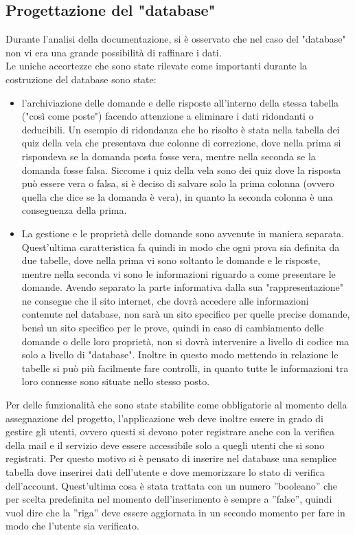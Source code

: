 \subsection{Progettazione del "database"}
Durante l'analisi della documentazione, si è osservato che nel caso del "database" non vi era una grande possibilità di raffinare i dati.\\
Le uniche accortezze che sono state rilevate come importanti durante la costruzione del database sono state:
\begin{itemize}
	\item l'archiviazione delle domande e delle risposte all'interno della stessa tabella ("così come poste") facendo attenzione a eliminare i dati ridondanti o deducibili. Un esempio di ridondanza che ho risolto è stata nella tabella dei quiz della vela che presentava due colonne di correzione, dove nella prima si rispondeva se la domanda posta fosse vera, mentre nella seconda se la domanda fosse falsa. Siccome i quiz della vela sono dei quiz dove la risposta può essere vera o falsa, si è deciso di salvare solo la prima colonna (ovvero quella che dice se la domanda è vera), in quanto la seconda colonna è una conseguenza della prima. 
	
	\item La gestione e le proprietà delle domande sono avvenute in maniera separata. Quest'ultima caratteristica fa quindi in modo che ogni prova sia definita da due tabelle, dove nella prima vi sono soltanto le domande e le risposte, mentre nella seconda vi sono le informazioni riguardo a come presentare le domande. Avendo separato la parte informativa dalla sua "rappresentazione" ne consegue che il sito internet, che dovrà accedere alle informazioni contenute nel database, non sarà un sito specifico per quelle precise domande, bensì un sito specifico per le prove, quindi in caso di cambiamento delle domande o delle loro proprietà, non si dovrà intervenire a livello di codice ma solo a livello di "database". Inoltre in questo modo mettendo in relazione le tabelle si può più facilmente fare controlli, in quanto tutte le informazioni tra loro connesse sono situate nello stesso posto.
\end{itemize}

Per delle funzionalità che sono state stabilite come obbligatorie al momento della assegnazione del progetto, l'applicazione web deve inoltre essere in grado di gestire gli utenti, ovvero questi si devono poter registrare anche con la verifica della mail e il servizio deve essere accessibile solo a quegli utenti che si sono registrati. Per questo motivo si è pensato di inserire nel database una semplice tabella dove inserirei dati dell'utente e dove memorizzare lo stato di verifica dell'account. Quest'ultima cosa è stata trattata con un numero ”booleano” che per scelta predefinita nel momento dell'inserimento è sempre a ”false”, quindi vuol dire che la ”riga” deve essere aggiornata in un secondo momento per fare in modo che l’utente sia verificato.